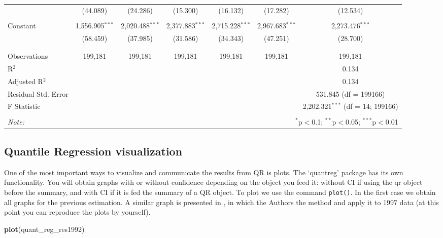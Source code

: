 \documentclass[]{book}
\newenvironment{Shaded}{\begin{snugshade}}{\end{snugshade}}
\newcommand{\KeywordTok}[1]{\textcolor[rgb]{0.13,0.29,0.53}{\textbf{#1}}}
\newcommand{\NormalTok}[1]{#1}
\begin{document}
\begin{table}[!htbp]
\begin{tabular}{@{\extracolsep{5pt}}lcccccc}
  & (44.089) & (24.286) & (15.300) & (16.132) & (17.282) & (12.534) \\
  & & & & & & \\
 Constant & 1,556.905$^{***}$ & 2,020.488$^{***}$ & 2,377.883$^{***}$ & 2,715.228$^{***}$ & 2,967.683$^{***}$ & 2,273.476$^{***}$ \\
  & (58.459) & (37.985) & (31.586) & (34.343) & (47.251) & (28.700) \\
  & & & & & & \\
\hline \\[-1.8ex]
Observations & 199,181 & 199,181 & 199,181 & 199,181 & 199,181 & 199,181 \\
R$^{2}$ &  &  &  &  &  & 0.134 \\
Adjusted R$^{2}$ &  &  &  &  &  & 0.134 \\
Residual Std. Error &  &  &  &  &  & 531.845 (df = 199166) \\
F Statistic &  &  &  &  &  & 2,202.321$^{***}$ (df = 14; 199166) \\
\hline
\hline \\[-1.8ex]
\textit{Note:}  & \multicolumn{6}{r}{$^{*}$p$<$0.1; $^{**}$p$<$0.05; $^{***}$p$<$0.01} \\
\end{tabular}
\end{table}

\subsection{Quantile Regression
visualization}\label{quantile-regression-visualization}

One of the most important ways to visualize and communicate the results
from QR is plots. The `quantreg' package has its own functionality. You
will obtain graphs with or without confidence depending on the object
you feed it: without CI if using the qr object before the summary, and
with CI if it is fed the summary of a QR object. To plot we use the
command \texttt{plot()}. In the first case we obtain all graphs for the
previous estimation. A similar graph is presented in
\citep{koenker2001quantile}, in which the Authors the method and apply
it to 1997 data (at this point you can reproduce the plots by yourself).

\begin{Shaded}
\begin{Highlighting}[]
\KeywordTok{plot}\NormalTok{(quant_reg_res1992)}
\end{Highlighting}
\end{Shaded}
\end{document}
